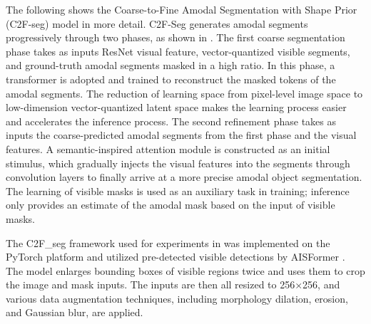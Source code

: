 The following shows the Coarse-to-Fine Amodal Segmentation with Shape Prior (C2F-seg) model in more detail. C2F-Seg generates amodal segments progressively through two phases, as shown in . The first coarse segmentation phase takes as inputs ResNet visual feature, vector-quantized visible segments, and ground-truth amodal segments masked in a high ratio. In this phase, a transformer is adopted and trained to reconstruct the masked tokens of the amodal segments. The reduction of learning space from pixel-level image space to low-dimension vector-quantized latent space makes the learning process easier and accelerates the inference process. The second refinement phase takes as inputs the coarse-predicted amodal segments from the first phase and the visual features. A semantic-inspired attention module is constructed as an initial stimulus, which gradually injects the visual features into the segments through convolution layers to finally arrive at a more precise amodal object segmentation. The learning of visible masks is used as an auxiliary task in training; inference only provides an estimate of the amodal mask based on the input of visible masks.

The C2F\_seg framework used for experiments in \cite{c2fseg} was implemented on the PyTorch platform and utilized pre-detected visible detections by AISFormer \cite{aisformer}. The model enlarges bounding boxes of visible regions twice and uses them to crop the image and mask inputs. The inputs are then all resized to 256×256, and various data augmentation techniques, including morphology dilation, erosion, and Gaussian blur, are applied.

